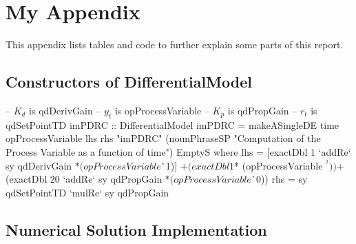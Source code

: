 \chapter{My Appendix}
\label{appendix_a}

This appendix lists tables and code to further explain some parts of this report.

\section{Constructors of DifferentialModel}
\label{const_de}

\begin{haskell1}
-- $K_d$ is qdDerivGain
-- $y_t$ is opProcessVariable
-- $K_p$ is qdPropGain
-- $r_t$ is qdSetPointTD
imPDRC :: DifferentialModel
imPDRC = makeASingleDE
	time
	opProcessVariable
	lhs
	rhs
	"imPDRC"
	(nounPhraseSP "Computation of the Process Variable as a function of time")
	EmptyS
	where 
	lhs = [exactDbl 1 `addRe` sy qdDerivGain $* (opProcessVariable $^^ 1)]
	$+ (exactDbl 1 $* (opProcessVariable $^^ 2))
	$+ (exactDbl 20 `addRe` sy qdPropGain $* (opProcessVariable $^^ 0))
	rhs = sy qdSetPointTD `mulRe` sy qdPropGain
\end{haskell1}


\pagebreak

\section{Numerical Solution Implementation}
\label{numsol}

